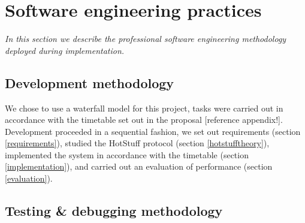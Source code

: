 

\section{Software engineering practices} \label{softwareeng}

\textit{In this section we describe the professional software engineering methodology deployed during implementation.}

\subsection{Development methodology} \label{waterfall}

We chose to use a waterfall model for this project, tasks were carried out in accordance with the timetable set out in the proposal [reference appendix!]. Development proceeded in a sequential fashion, we set out requirements (section \ref{requirements}), studied the HotStuff protocol (section \ref{hotstufftheory}), implemented the system in accordance with the timetable (section \ref{implementation}), and carried out an evaluation of performance (section \ref{evaluation}).

\subsection{Testing \& debugging methodology} \label{testing}

